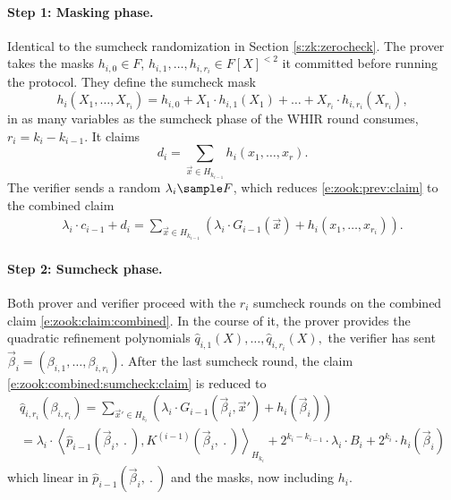 \paragraph{Step 1: Masking phase.}
Identical to the sumcheck randomization in Section \ref{s:zk:zerocheck}.
The prover takes the masks $h_{i,0}\in F$, $h_{i,1},\ldots,h_{i,r_i} \in F[X]^{<2}$ it committed before running the protocol. 
They define the sumcheck mask
\begin{equation}
\label{e:zook:sumcheck:mask}
h_i(X_1,\ldots, X_{r_i}) = h_{i,0} + X_1 \cdot h_{i,1}(X_1) + \ldots + X_{r_i} \cdot h_{i,r_{i}}(X_{r_i}),
\end{equation}
in as many variables as the sumcheck phase of the WHIR round consumes, $r_i = k_i - k_{i-1}$.
It claims 
\[
d_i = \sum_{\vec x\in H_{k_{i-1}}} h_i(x_1,\ldots, x_r).
\]
The verifier sends a random $\lambda_i\sample F$, which reduces  \eqref{e:zook:prev:claim} to the combined claim
\begin{align}
\label{e:zook:combined:sumcheck:claim}
\lambda_i\cdot c_{i-1} + d_i = \sum_{\vec x\in H_{k_{i-1}}} 
\left(\lambda_i \cdot G_{i-1}(\vec x) + h_i(x_1,\ldots, x_{r_i})
\right).
\end{align}

\paragraph{Step 2: Sumcheck phase.}
Both prover and verifier proceed with the $r_i$ sumcheck rounds on the combined claim \eqref{e:zook:claim:combined}.
In the course of it, the prover provides the quadratic refinement polynomials
$
\hat q_{i,1}(X), \ldots, \hat q_{i,r_i}(X), 
$ 
the verifier has sent $\vec\beta_i = (\beta_{i,1},\ldots, \beta_{i,r_i})$.
After the last sumcheck round, the claim \eqref{e:zook:combined:sumcheck:claim} is reduced to 
\begin{multline*}
\hat q_{i,r_i}(\beta_{i,r_i}) 
= \sum_{\vec x'\in H_{k_i}} \left(
\lambda_ i \cdot G_{i-1}(
\vec\beta_i,\vec x') + h_i(\vec\beta_{i})
\right)
\\
= \lambda_i\cdot \left\langle \hat p_{i-1}(\vec \beta_i, \:.\:), K^{(i-1)}(\vec\beta_i,\:.\:)\right\rangle_{H_{k_i}} + 2^{k_i - k_{i-1}}\cdot \lambda_i\cdot B_i + 2^{k_i}\cdot h_i(\vec\beta_i)
\end{multline*}
which linear in $\hat p_{i-1}(\vec\beta_{i},\:.\:)$ and the masks, now including $h_i$.

